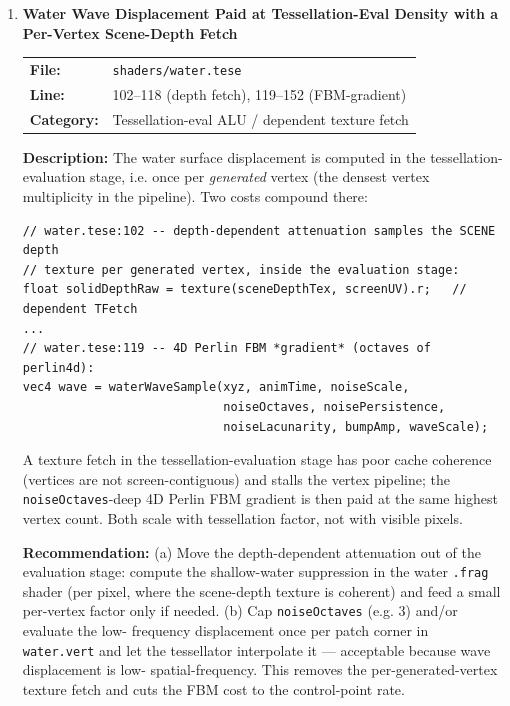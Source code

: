 \documentclass[a4paper,12pt]{article}
\newcommand{\severitybox}[2]{%
  \colorbox{#1}{\makebox[2.5cm][c]{\textcolor{white}{\textbf{#2}}}}%
}
\begin{document}
\begin{enumerate}[leftmargin=*]
\item[\textbf{[N2]}] \textbf{Water Wave Displacement Paid at Tessellation-Eval Density with a Per-Vertex Scene-Depth Fetch}
  \hfill \severitybox{mediumcolor}{MEDIUM}

  \begin{tabular}{ll}
    \textbf{File:} & \texttt{shaders/water.tese} \\
    \textbf{Line:} & 102--118 (depth fetch), 119--152 (FBM-gradient) \\
    \textbf{Category:} & Tessellation-eval ALU / dependent texture fetch \\
  \end{tabular}

  \textbf{Description:}
  The water surface displacement is computed in the tessellation-evaluation
  stage, i.e. once per \emph{generated} vertex (the densest vertex multiplicity in
  the pipeline). Two costs compound there:

\begin{lstlisting}
// water.tese:102 -- depth-dependent attenuation samples the SCENE depth
// texture per generated vertex, inside the evaluation stage:
float solidDepthRaw = texture(sceneDepthTex, screenUV).r;   // dependent TFetch
...
// water.tese:119 -- 4D Perlin FBM *gradient* (octaves of perlin4d):
vec4 wave = waterWaveSample(xyz, animTime, noiseScale,
                            noiseOctaves, noisePersistence,
                            noiseLacunarity, bumpAmp, waveScale);
\end{lstlisting}

  A texture fetch in the tessellation-evaluation stage has poor cache coherence
  (vertices are not screen-contiguous) and stalls the vertex pipeline; the
  \texttt{noiseOctaves}-deep 4D Perlin FBM gradient is then paid at the same
  highest vertex count. Both scale with tessellation factor, not with visible
  pixels.

  \textbf{Recommendation:}
  (a) Move the depth-dependent attenuation out of the evaluation stage: compute
  the shallow-water suppression in the water \texttt{.frag} shader (per pixel,
  where the scene-depth texture is coherent) and feed a small per-vertex factor
  only if needed. (b) Cap \texttt{noiseOctaves} (e.g. 3) and/or evaluate the low-
  frequency displacement once per patch corner in \texttt{water.vert} and let the
  tessellator interpolate it — acceptable because wave displacement is low-
  spatial-frequency. This removes the per-generated-vertex texture fetch and
  cuts the FBM cost to the control-point rate.


\end{enumerate}
\end{document}
